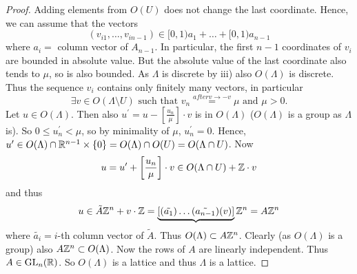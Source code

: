 \documentclass[NumTh.tex]{subfiles}
\begin{document}
\begin{proof}
  Adding elements from $O(U)$ does not change the last coordinate.
  Hence, we can assume that the vectors 
  \[ (v_{i1},\dots,v_{in-1}) \in [0,1)a_1 + \dots + [0,1) a_{n-1} \]
  where $a_i =$ column vector of $A_{n-1}$.
  In particular, the first $n-1$ coordinates of $v_i$ are  bounded in absolute value.
  But the absolute value of the last coordinate also tends to $\mu$, so is also bounded.
  As $\Lambda$ is discrete by iii) also $O(\Lambda)$ is discrete.
  Thus the sequence $v_i$ contains only finitely many vectors, in particular
  \[ \exists v \in O(\Lambda \setminus U) \text{ such that } v_n \overset{after v \to -v}{=} \mu \text{ and } \mu > 0 \text{.}\]
  Let $u \in O(\Lambda)$.
  Then also $u^\prime = u - \left[ \frac{u_n}{\mu} \right] \cdot v$ is in $O(\Lambda)$ ($O(\Lambda)$ is a group as $\Lambda$ is).
  So $0 \leq u_n^\prime < \mu$, so by minimality of $\mu$, $u_n^\prime = 0$.
  Hence, $u^\prime \in O(\Lambda) \cap \mathbb{R}^{n-1} \times \{ 0 \} = O(\Lambda) \cap O(U) = O(\Lambda \cap U)$.
  Now 
  \[ u = u^\prime + \left[ \frac{u_n}{\mu} \right] \cdot v \in O(\Lambda \cap U) + \mathbb{Z} \cdot v\]
  and thus
  \[ u \in \tilde{A} \mathbb{Z}^n + v \cdot \mathbb{Z} = \underbrace{\left[ (\tilde{a_1}) \dots (\tilde{a_{n-1}}) (v)  \right]} \mathbb{Z}^n = A \mathbb{Z}^n \]
  where $\tilde{a_i} = i$-th column vector of $\tilde{A}$.
  Thus $O(\Lambda) \subset A \mathbb{Z}^n$.
  Clearly (as $O(\Lambda)$ is a group) also $A \mathbb{Z}^n \subset O(\Lambda)$.
  Now the rows of $A$ are linearly independent.
  Thus $A \in \operatorname{GL}_n(\mathbb{R})$.
  So $O(\Lambda)$ is a lattice and thus $\Lambda$ is a lattice.
\end{proof}
\end{document}
